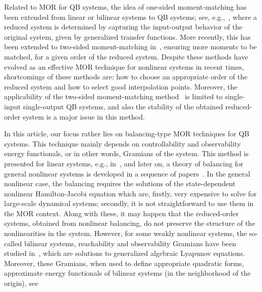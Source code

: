Related to MOR for QB systems, the idea of one-sided  moment-matching has been extended from linear or bilinear systems to QB systems; see, e.g.,~\cite{bai2002krylov,feng2004direct,morGu09,li2005compact,morPhi03}, where a reduced system is determined by capturing the input-output behavior of the original system,   given by generalized transfer functions. More recently, this has been extended to two-sided moment-matching in~\cite{morBenB15}, ensuring more  moments to be matched, for a given order of the reduced system. Despite these methods have evolved as an effective MOR technique for nonlinear systems in recent times, shortcomings of these methods are: how to choose an appropriate order of the reduced system and how to select good interpolation points. Moreover, the applicability of the two-sided moment-matching method~\cite{morBenB15} is limited to single-input single-output QB systems, and also the stability of the obtained reduced-order system is a major issue in this method.

In this article, our focus rather lies on balancing-type MOR techniques for QB systems. This technique mainly depends on controllability and observability energy functionals, or in other words, Gramians of the system.  This method is presented for linear systems, e.g., in~\cite{morAnt05,morMoo81}, and later on, a theory of balancing for general nonlinear systems is developed in a sequence of papers~\cite{morfuji10,morgray2001,morSch93,morsche1996h,morsche94nor}.  In the general nonlinear case, the balancing requires  the solutions of the state-dependent nonlinear Hamilton-Jacobi equation which are, firstly, very expensive to solve for large-scale dynamical systems; secondly, it is not  straightforward  to use them in the MOR context. Along with these, it may happen that the reduced-order systems, obtained from nonlinear balancing, do not preserve the structure of the nonlinearities in the system. However, for some  weakly nonlinear systems,  the so-called bilinear systems, reachability and observability Gramians have been  studied in~\cite{moral1994,morBenD11,bennertruncated,morcondon2005,enefungray98}, which are solutions to generalized algebraic Lyapunov equations. Moreover, these Gramians, when used to define appropriate  quadratic forms, approximate  energy functionals of bilinear systems (in the neighborhood of the origin), see~\cite{morBenD11, bennertruncated}

